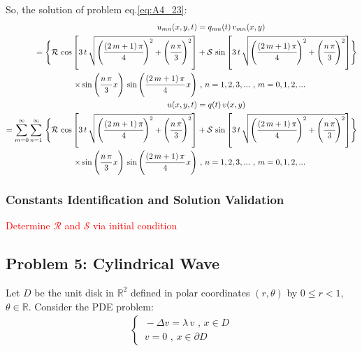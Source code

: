 \documentclass[../main.tex]{subfiles}
\begin{document}
So, the solution of problem eq.\ref{eq:A4_23}:
\begin{align}
    u_{mn}(x, y, t) &= q_{mn}(t) \, v_{mn}(x, y) \nonumber \\
    = \Bigg\{\mathcal{R} \, \cos{\left[3 \, t \, \sqrt{\left(\cfrac{(2 \, m + 1) \, \pi}{4} \right)^2 + \left(\cfrac{n \, \pi}{3} \right)^2} \right]} &+ \mathcal{S} \, \sin{\left[3 \, t \, \sqrt{\left(\cfrac{(2 \, m + 1) \, \pi}{4} \right)^2 + \left(\cfrac{n \, \pi}{3} \right)^2} \right]} \Bigg\} \nonumber \\
    \times \sin{\left(\cfrac{n \, \pi}{3} \, x \right)} \, \sin{\left(\cfrac{(2 \, m + 1) \, \pi}{4} \, x \right)} & \text{ ,  } n = 1, 2, 3, ... \text{ ,  } m = 0, 1, 2, ... \\
    u(x, y, t) &= q(t) \, v(x, y) \nonumber \\
    = \sum_{m=0}^{\infty} \sum_{n=1}^{\infty} \, \Bigg\{\mathcal{R} \, \cos{\left[3 \, t \, \sqrt{\left(\cfrac{(2 \, m + 1) \, \pi}{4} \right)^2 + \left(\cfrac{n \, \pi}{3} \right)^2} \right]} &+ \mathcal{S} \, \sin{\left[3 \, t \, \sqrt{\left(\cfrac{(2 \, m + 1) \, \pi}{4} \right)^2 + \left(\cfrac{n \, \pi}{3} \right)^2} \right]} \Bigg\} \nonumber \\
    \times \sin{\left(\cfrac{n \, \pi}{3} \, x \right)} \, \sin{\left(\cfrac{(2 \, m + 1) \, \pi}{4} \, x \right)} & \text{ ,  } n = 1, 2, 3, ... \text{ ,  } m = 0, 1, 2, ...
\end{align}

\subsubsection{Constants Identification and Solution Validation}

\textcolor{red}{Determine $\mathcal{R}$ and $\mathcal{S}$ via initial condition}

\subsection{Problem 5: Cylindrical Wave}

Let $D$ be the unit disk in $\mathbb{R}^2$ defined in polar coordinates $(r, \theta)$ by $0 \leqslant r < 1$, $\theta \in \mathbb{R}$. Consider the PDE problem:
\begin{align}
    \begin{cases} \label{eq:A2_51}
        \, - \Delta v = \lambda \, v \text{ ,  } x \in D \\
        \, v = 0 \text{ ,   } x \in \partial D
    \end{cases}
\end{align}
\end{document}
